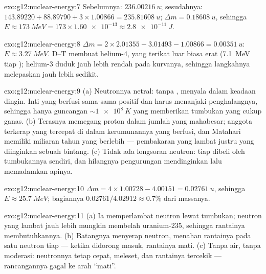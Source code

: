 \begin{solution}{exo:g12:nuclear-energy:7}
Sebelumnya: $\qty{236.00216}{u}$; sesudahnya: $143.89220 + 88.89790 +
3 \times 1.00866 = \qty{235.81608}{u}$; $\Delta m = \qty{0.18608}{u}$,
sehingga $E \approx \qty{173}{MeV} = 173 \times \num{1.60e-13} \approx
\qty{2.8e-11}{J}$.
\end{solution}

\begin{solution}{exo:g12:nuclear-energy:8}
$\Delta m = 2 \times 2.01355 - 3.01493 - 1.00866 = \qty{0.00351}{u}$:
$E \approx \qty{3.27}{MeV}$. D--T membuat helium-4, yang terikat luar biasa erat
(\qty{7.1}{MeV} tiap ); helium-3 duduk jauh lebih rendah pada kurvanya, sehingga
langkahnya melepaskan jauh lebih sedikit.
\end{solution}

\begin{solution}{exo:g12:nuclear-energy:9}
(a) Neutronnya netral: tanpa ,  menyala dalam keadaan dingin.
Inti yang berfusi sama-sama positif dan harus menanjaki penghalangnya, sehingga hanya
guncangan $\sim \qty{1e8}{K}$ yang memberikan tumbukan yang cukup ganas. (b)
Terasnya memegang proton dalam jumlah yang mahabesar; anggota terkerap yang tercepat di
dalam kerumunannya yang berfusi, dan Matahari memiliki miliaran tahun yang berlebih
--- pembakaran yang lambat justru yang diinginkan sebuah bintang. (c) Tidak ada longsoran
neutron: tiap  dibeli oleh tumbukannya sendiri, dan hilangnya
pengurungan mendinginkan  lalu memadamkan apinya.
\end{solution}

\begin{solution}{exo:g12:nuclear-energy:10}
$\Delta m = 4 \times 1.00728 - 4.00151 = \qty{0.02761}{u}$, sehingga
$E \approx \qty{25.7}{MeV}$; bagiannya
$0.02761/4.02912 \approx 0.7\%$ dari massanya.
\end{solution}

\begin{solution}{exo:g12:nuclear-energy:11}
(a) Ia memperlambat neutron  lewat tumbukan; neutron yang lambat jauh
lebih mungkin membelah uranium-235, sehingga rantainya membutuhkannya. (b) Batangnya
menyerap neutron, menahan rantainya pada satu neutron tiap  ---
ketika didorong masuk, rantainya mati. (c) Tanpa air, tanpa moderasi: neutronnya tetap
cepat, meleset, dan rantainya tercekik --- rancangannya gagal ke arah
``mati''.
\end{solution}

